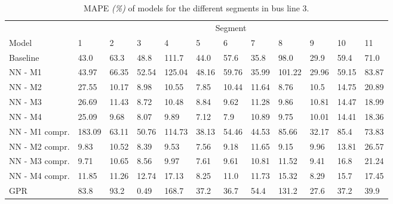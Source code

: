 \begin{table}[H]
  \centering
  \caption{MAPE \textit{(\%)} of models for the different segments in bus line 3.}
  \label{fig:model-mape-of-segs-203}
  \begin{adjustbox}{center}
\begin{tabular}{ l | l | l | l | l | l | l | l | l | l | l | l }
	& \multicolumn{11}{c}{Segment} \\
	Model       & 1 & 2 & 3 & 4 & 5 & 6 & 7 & 8 & 9 & 10 & 11 \\
	\hline
	Baseline  & 43.0 & 63.3 & 48.8 & 111.7 & 44.0 & 57.6 & 35.8 & 98.0 & 29.9 & 59.4  & 71.0 \\
	NN - M1         & 43.97& 66.35& 52.54& 125.04& 48.16& 59.76& 35.99& 101.22& 29.96& 59.15& 83.87 \\
    	NN - M2         & 27.55& 10.17& 8.98& 10.55& 7.85& 10.44& 11.64& 8.76& 10.5& 14.75& 20.89\\
    	NN - M3        & 26.69& 11.43& 8.72& 10.48& 8.84& 9.62& 11.28& 9.86& 10.81& 14.47& 18.99\\
    	NN - M4        & 25.09& 9.68& 8.07& 9.89& 7.12& 7.9& 10.89& 9.75& 10.01& 14.41& 18.36\\
    	NN - M1 compr.         & 183.09& 63.11& 50.76& 114.73& 38.13& 54.46& 44.53& 85.66& 32.17& 85.4& 73.83 \\ 
    	NN - M2 compr.         & 9.83& 10.52& 8.39& 9.53& 7.56& 9.18& 11.65& 9.15& 9.96& 13.81& 26.57 \\
    	NN - M3 compr.         & 9.71& 10.65& 8.56& 9.97& 7.61& 9.61& 10.81& 11.52& 9.41& 16.8& 21.24 \\
    	NN - M4 compr.         & 11.85& 11.26& 12.74& 17.13& 8.25& 11.0& 11.73& 15.32& 8.29& 15.7& 17.45 \\
	GPR         & 83.8 & 93.2 & 0.49 & 168.7 & 37.2 & 36.7 &  54.4 & 131.2 & 27.6 &37.2 & 39.9 \\
\end{tabular}
\end{adjustbox}
\end{table}

